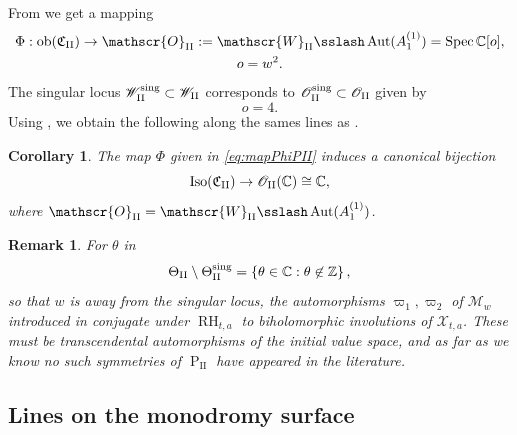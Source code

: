 \documentclass[a4paper,reqno]{amsart}
\numberwithin{equation}{section}
\newcommand{\Z}{\mathbb{Z}}
\newcommand{\C}{\mathbb{C}}
\newcommand{\pain}[1]{\operatorname{P}_{\mathrm{#1}}}
\DeclareMathOperator{\Spec}{Spec}
\DeclareMathOperator{\Aut}{Aut}
\newtheorem{remark}[theorem]{Remark}
\newtheorem{corollary}[theorem]{Corollary}
\numberwithin{equation}{section}
\begin{document}
From  we get a mapping
\begin{equation} \label{eq:mapPhiPII}
\begin{gathered}
    \Phi : \operatorname{ob}(\mathfrak{C}_{\rm{II}})\to \mathscr{O}_{\rm{II}}:= \mathscr{W}_{\rm{II}}\sslash \Aut(A_1^{(1)}) = \Spec \C[o], \\
    o = w^2. 
\end{gathered}
\end{equation}
The singular locus $\mathscr{W}_{\rm{II}}^{\operatorname{sing}}\subset \mathscr{W}_{\rm{II}}$ corresponds to $\mathscr{O}_{\rm{II}}^{\operatorname{sing}}\subset\mathscr{O}_{\rm{II}}$ given by 
$$ o = 4.$$
Using , we obtain the following along the sames lines as .
\begin{corollary} \label{cor:modulispacePII}
The map $\Phi$ given in \eqref{eq:mapPhiPII} induces a canonical bijection 
    $$\operatorname{Iso}(\mathfrak{C}_{\rm{II}}) \to \mathscr{O}_{\rm{II}}(\C)\cong\C,$$
    where $\mathscr{O}_{\rm{II}} = \mathscr{W}_{\rm{II}} \sslash \operatorname{Aut}(A_1^{(1)})$.
    \end{corollary}

\begin{remark} \label{rem:mysterysymmetryPII}
    For $\theta$ in 
        $$\Theta_{\rm{II}}\setminus \Theta_{\rm{II}}^{\operatorname{sing}} = \left\{ \theta \in \C : \theta\not\in  \Z \right\},$$
so that $w$ is away from the singular locus, the automorphisms $\varpi_1,\varpi_2$ of $\mathcal{M}_w$ introduced in  conjugate under $\operatorname{RH}_{t,a}$ to biholomorphic involutions of $\mathcal{X}_{t,a}$.
These must be transcendental automorphisms of the initial value space, and as far as we know no such symmetries of $\pain{II}$ have appeared in the literature.
\end{remark}




\subsection{Lines on the monodromy surface}
\end{document}
